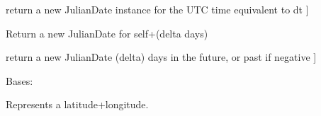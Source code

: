 \documentclass[letterpaper,10pt,english]{sphinxmanual}
\begin{document}
\begin{fulllineitems}
\begin{fulllineitems}
\begin{description}
\begin{description}
\sphinxAtStartPar
return a new JulianDate instance for the UTC
time equivalent to dt {]}

\end{description}

\end{description}

\end{fulllineitems}


\begin{fulllineitems}
\label{\detokenize{api/killMS.Data:killMS.Data.sidereal.JulianDate.offset}}
\pysigstartsignatures
{}
\pysigstopsignatures
\sphinxAtStartPar
Return a new JulianDate for self+(delta days)
\begin{description}
\sphinxlineitem{{[} delta is a number of days as a float \sphinxhyphen{}\textgreater{}}
\sphinxAtStartPar
return a new JulianDate (delta) days in the
future, or past if negative {]}

\end{description}

\end{fulllineitems}


\end{fulllineitems}


\begin{fulllineitems}
\label{\detokenize{api/killMS.Data:killMS.Data.sidereal.LatLon}}
\pysigstartsignatures
{}
\pysigstopsignatures
\sphinxAtStartPar
Bases: 

\sphinxAtStartPar
Represents a latitude+longitude.

\end{fulllineitems}

\end{document}
